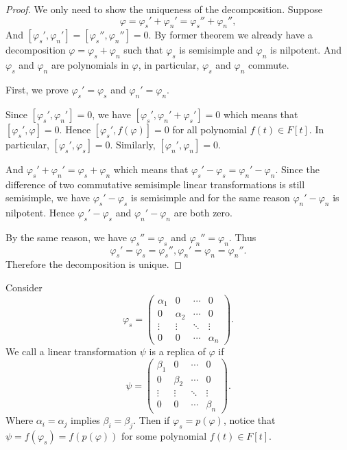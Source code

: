 \begin{proof}
    We only need to show the uniqueness of the decomposition. Suppose
    \[
        \varphi=\varphi_s'+\varphi_n'=\varphi_s''+\varphi_n'',
    \]
    And $[\varphi_s',\varphi_n']=[\varphi_s'',\varphi_n'']=0$. By former theorem we already have a decomposition $\varphi=\varphi_s+\varphi_n$ such that $\varphi_s$ is semisimple and $\varphi_n$ is nilpotent. And $\varphi_s$ and $\varphi_n$ are polynomials in $\varphi$, in particular, $\varphi_s$ and $\varphi_n$ commute.

    First, we prove $\varphi_s'=\varphi_s$ and $\varphi_n'=\varphi_n$.

    Since $[\varphi_s',\varphi_n']=0$, we have $[\varphi_s',\varphi_n'+\varphi_s']=0$ which means that $[\varphi_s', \varphi]=0$. Hence $[\varphi_s', f(\varphi)]=0$ for all polynomial $f(t) \in F[t]$. In particular, $[\varphi_s', \varphi_s]=0$. Similarly, $[\varphi_n', \varphi_n]=0$.

    And $\varphi_s'+ \varphi_n'= \varphi_s+ \varphi_n$ which means that $\varphi_s'- \varphi_s= \varphi_n'- \varphi_n$. Since the difference of two commutative semisimple linear transformations is still semisimple, we have $\varphi_s'- \varphi_s$ is semisimple and for the same reason $\varphi_n'- \varphi_n$ is nilpotent. Hence $\varphi_s'- \varphi_s$ and $\varphi_n'- \varphi_n$ are both zero.

    By the same reason, we have $\varphi_s''=\varphi_s$ and $\varphi_n''=\varphi_n$. Thus
    \[
        \varphi_s'=\varphi_s=\varphi_s'',\varphi_n'=\varphi_n=\varphi_n''.
    \]
    Therefore the decomposition is unique.
\end{proof}

\begin{definition}
    Consider
    \[
        \varphi_s=
        \begin{pmatrix}
            \alpha_1 & 0        & \cdots & 0        \\
            0        & \alpha_2 & \cdots & 0        \\
            \vdots   & \vdots   & \ddots & \vdots   \\
            0        & 0        & \cdots & \alpha_n
        \end{pmatrix}.
    \]
    We call a linear transformation $\psi$ is a replica of $\varphi$ if
    \[
        \psi=
        \begin{pmatrix}
            \beta_1 & 0       & \cdots & 0       \\
            0       & \beta_2 & \cdots & 0       \\
            \vdots  & \vdots  & \ddots & \vdots  \\
            0       & 0       & \cdots & \beta_n
        \end{pmatrix}.
    \]
    Where $\alpha_i=\alpha_j$ implies $\beta_i=\beta_j$. Then if $\varphi_s=p(\varphi)$, notice that $\psi=f(\varphi_s)=f(p(\varphi))$ for some polynomial $f(t) \in F[t]$.
\end{definition}

